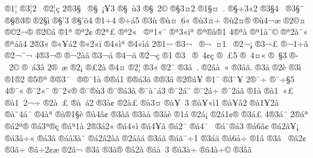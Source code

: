 {^^ae1^^a6
^^ae3^^a62^^a0
^^ae2^^a6^^e7
2^^ae3^^a7^^a0
^^ae^^a7^^a0^^a1^^a53
^^ae^^a7^^a0^^f93
^^ae^^a7^^a02^^a9
^^ae^^a73^^a42
^^ae1^^a7^^a4^^a0.
^^ae^^a7^^f73^^ab2
^^ae3^^a74^^ad^^a0
^^ae3^^a7^^ad^^a8
^^ae^^a7^^ae3^^ae
^^ae2^^a7^^ec
^^ae^^a7'3
^^ae^^a7'^^f54
^^ae1^^f74
^^ae^^f7^^ad^^e15
^^ae3^^f9
^^ae^^f9^^a4^^a06^^ab
^^ae^^f93^^a4^^f7
^^ae^^f92^^a4^^ae
^^ae^^f94^^ac^^e6
^^ae2^^a9^^a4
^^ae^^a92^^ac^^ae
^^ae2^^a9^^e2
^^ae1^^aa
^^ae^^aa2^^a2
^^ae2^^aa^^a3
^^ae^^aa2^^ab^^a0
^^ae^^aa1^^ab^^a8
^^ae^^aa3^^ab^^ef^^aa
^^ae^^aa^^ae^^e0^^ae1
4^^ae^^aa^^e0
^^ae^^aa1^^e0^^a8^^a9
^^ae^^aa2^^e0^^a8^^ab
^^ae^^aa^^e1^^e24
2^^ae3^^ab
^^ae^^ab^^a5^^e12
^^ae^^ab2^^ab^^ef
^^ae4^^ab^^ec^^aa
^^ae4^^ab^^ec^^e1
2^^ae1^^ac
^^ae3^^ac^^a0
^^ae^^ac^^a0^^ad^^a41^^a0
^^ae2^^ac^^a1
^^ae3^^ac^^a3
^^ae^^ac1^^f7^^ad^^e2
^^ae2^^ac^^ad^^a8^^ac
4^^ae3^^ac^^ae
^^ae^^ac2^^e0^^e3
^^ae3^^ac^^e1
^^ae4^^ac^^e4
^^ae2^^ac^^e7
^^ae1^^ad
^^ae3^^ad^^a0
^^ae^^ad^^a04^^a2^^e7
^^ae^^ad^^a0^^a35^^ad
^^ae^^ad^^a04^^a4^^ab
^^ae^^ad^^a0^^a73
^^ae^^ad^^a02^^a9
^^ae^^ad^^a0^^e13^^e2
2^^ae^^ad^^a0^^e6
^^ae2^^ad^^a1
^^ae^^ad^^a32^^e0
^^ae4^^ad^^a4
^^ae2^^ad^^a6
^^ae3^^ad^^ab
^^ae2^^ad^^af
^^ae3^^ad^^e2^^a0.
^^ae^^ad2^^e2^^e0^^a0^^ab
^^ae3^^ad^^e2^^e3.
^^ae3^^ad^^e5
^^ae2^^ad^^e8
^^ae3^^ad^^ec
^^ae1^^ae2
^^ae5^^ae^^aa
^^ae^^ae3^^af^^a0
^^ae^^ae^^af1^^e0
^^ae^^ae^^e11
^^ae^^ae^^e13^^e4
^^ae^^ae3^^e2
^^ae2^^ae^^e2^^a5
^^ae1^^af
^^ae3^^af^^a5
2^^ae^^af^^f7
^^ae^^af^^f7^^a75
4^^ae^^af^^ab
^^ae^^af2^^ab^^a8
^^ae^^af2^^ab^^ae
^^ae^^af^^ae^^f93
^^ae^^af^^ae^^e13^^e2
^^ae^^af^^e0^^a8^^e13
^^ae^^af2^^e1^^a8
^^ae^^af2^^e1^^f7
^^ae^^af2^^e1^^e3
^^ae1^^e0
^^ae^^e01^^a0^^ab^^a3
^^ae^^e01^^a02^^ac^^f7
^^ae2^^e0^^a0^^ad^^a3
^^ae^^e0^^a0^^e12
^^ae3^^e0^^a2
^^ae2^^e0^^a3
^^ae^^e03^^a4
^^ae^^e0^^a5^^a03
^^ae^^e0^^a5^^ab^^ec1
^^ae^^e0^^a5^^e22
^^ae^^e01^^a52^^e2^^a0
^^ae^^e0^^a84^^e1^^af
^^ae4^^e0^^aa
^^ae^^e0^^ae1^^a7^^e8
^^ae^^e04^^e2^^a2
^^ae3^^e0^^e3
^^ae3^^e0^^e5
^^ae3^^e0^^e8
^^ae1^^e1
^^ae2^^e1^^a1
^^ae2^^e11^^a2^^ae
^^ae3^^e1^^a3
4^^ae3^^e1^^a8
2^^ae^^e1^^aa
^^ae^^e12^^aa^^ae
^^ae^^e13^^aa^^ae^^e7
^^ae^^e1^^aa1^^e0
2^^ae3^^e12^^ab
^^ae^^e14^^ab^^ec
^^ae^^e14^^ad^^a5^^e2
^^ae^^e12^^af
^^ae^^e14^^af^^a0
^^ae^^e1^^af^^ae^^e13
^^ae^^e16^^e2^^a2
^^ae^^e12^^e2^^a5^^a1
^^ae^^e13^^e2^^f7^^ab
^^ae^^e13^^e2^^ad
^^ae^^e1^^e23^^e0^^a8
^^ae^^e12^^e22^^e0^^e3
^^ae2^^e1^^e2^^e1
^^ae3^^e1^^e3
^^ae^^e1^^e3^^af^^f71
^^ae3^^e1^^e4
^^ae^^e16^^e5^^f7
^^ae1^^e2
^^ae3^^e2^^a0
^^ae^^e22^^a2
^^ae3^^e2^^f7
^^ae^^e2^^f72^^a2^^e6
^^ae2^^e2^^ac
^^ae3^^e2^^ad
^^ae3^^e2^^ae
^^ae^^e22^^e0
^^ae^^e2^^e0^^a0^^ad3
^^ae^^e23^^e0^^f7
^^ae^^e24^^e0^^f7^^a9
^^ae3^^e2^^e3
}
